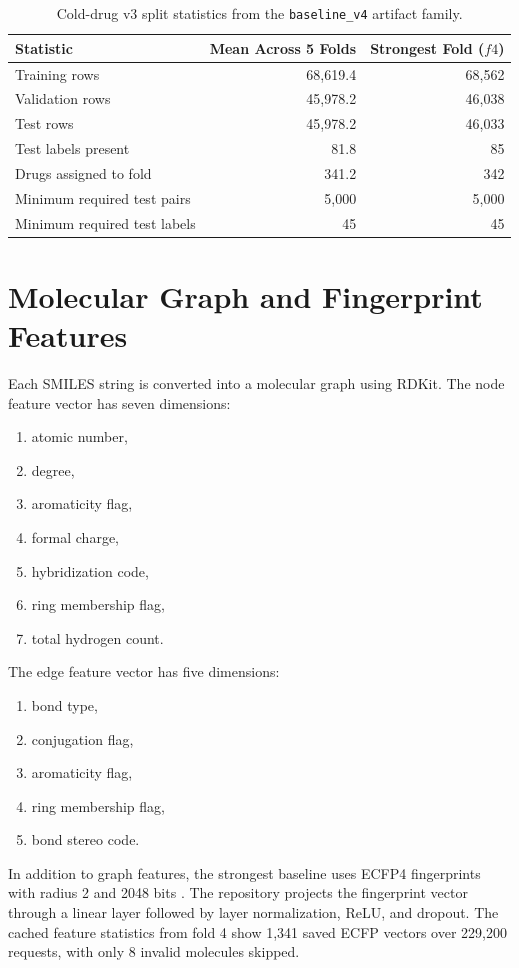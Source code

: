 \documentclass[12pt,a4paper]{report}
\begin{document}
\begin{table}[H]
\centering
\caption{Cold-drug v3 split statistics from the \texttt{baseline\_v4} artifact family.}
\label{tab:split_stats}
\begin{tabular}{lrr}
\toprule
Statistic & Mean Across 5 Folds & Strongest Fold (\(f4\)) \\
\midrule
Training rows & 68{,}619.4 & 68{,}562 \\
Validation rows & 45{,}978.2 & 46{,}038 \\
Test rows & 45{,}978.2 & 46{,}033 \\
Test labels present & 81.8 & 85 \\
Drugs assigned to fold & 341.2 & 342 \\
Minimum required test pairs & 5{,}000 & 5{,}000 \\
Minimum required test labels & 45 & 45 \\
\bottomrule
\end{tabular}
\end{table}

\section{Molecular Graph and Fingerprint Features}
Each SMILES string is converted into a molecular graph using RDKit. The node feature vector has seven dimensions:
\begin{enumerate}
  \item atomic number,
  \item degree,
  \item aromaticity flag,
  \item formal charge,
  \item hybridization code,
  \item ring membership flag,
  \item total hydrogen count.
\end{enumerate}

The edge feature vector has five dimensions:
\begin{enumerate}
  \item bond type,
  \item conjugation flag,
  \item aromaticity flag,
  \item ring membership flag,
  \item bond stereo code.
\end{enumerate}

In addition to graph features, the strongest baseline uses ECFP4 fingerprints with radius 2 and 2048 bits \cite{rogers2010ecfp}. The repository projects the fingerprint vector through a linear layer followed by layer normalization, ReLU, and dropout. The cached feature statistics from fold 4 show 1{,}341 saved ECFP vectors over 229{,}200 requests, with only 8 invalid molecules skipped.
\end{document}
